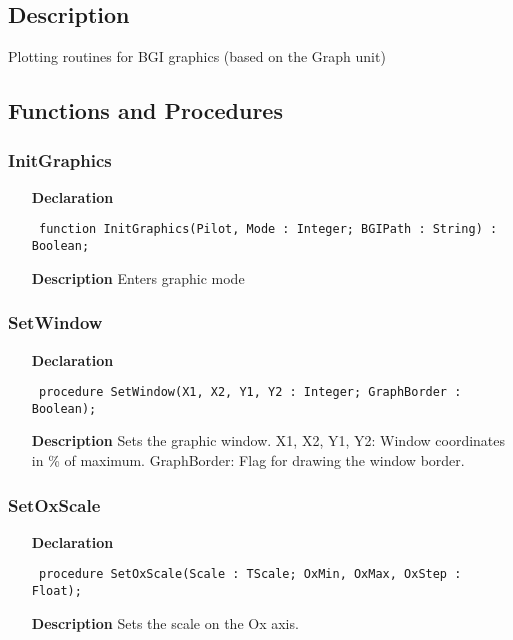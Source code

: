 \documentclass[12pt,a4paper,oneside]{report}
\newcommand{\declarationitem}[1]{\textbf{#1}}
\newcommand{\descriptiontitle}[1]{\textbf{#1}}
\newcommand{\code}[1]{\texttt{#1}}
\begin{document}
\subsection{Description}
Plotting routines for BGI graphics (based on the Graph unit) \subsection{Functions and Procedures}
\subsubsection{InitGraphics}
\label{uplot-InitGraphics}
\begin{itemize}\item[\declarationitem{Declaration}\hfill]
	\begin{flushleft}
		\code{
			function InitGraphics(Pilot, Mode : Integer; BGIPath : String) : Boolean;}
		
	\end{flushleft}
	
	\par
	\item[\descriptiontitle{Description}]
	Enters graphic mode
\end{itemize}
\subsubsection{SetWindow}
\label{uplot-SetWindow}
\begin{itemize}\item[\declarationitem{Declaration}\hfill]
	\begin{flushleft}
		\code{
			procedure SetWindow(X1, X2, Y1, Y2 : Integer; GraphBorder : Boolean);}
		
	\end{flushleft}
	
	\par
	\item[\descriptiontitle{Description}]
	Sets the graphic window. X1, X2, Y1, Y2: Window coordinates in {\%} of maximum. GraphBorder: Flag for drawing the window border.
	
\end{itemize}
\subsubsection{SetOxScale}
\label{uplot-SetOxScale}
\begin{itemize}\item[\declarationitem{Declaration}\hfill]
	\begin{flushleft}
		\code{
			procedure SetOxScale(Scale : TScale; OxMin, OxMax, OxStep : Float);}
		
	\end{flushleft}
	
	\par
	\item[\descriptiontitle{Description}]
	Sets the scale on the Ox axis.
\end{itemize}
\end{document}
